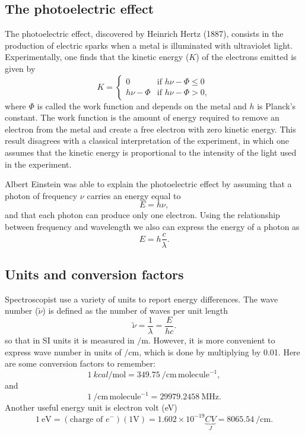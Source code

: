\documentclass[../Main/chem331-notes.tex]{subfiles}
\begin{document}
\subsection{The photoelectric effect}
The photoelectric effect, discovered by Heinrich Hertz (1887), consists in the production of electric sparks when a metal is illuminated with ultraviolet light.
Experimentally, one finds that the kinetic energy ($K$) of the electrons emitted is given by
\begin{equation}
K = \begin{cases}
0 & \text{if } h\nu - \Phi  \leq 0 \\
h\nu - \Phi & \text{if } h\nu - \Phi  > 0,
\end{cases}
\end{equation}
where $\Phi$ is called the work function and depends on the metal and $h$ is Planck's constant.
The work function is the amount of energy required to remove an electron from the metal and create a free electron with zero kinetic energy.
This result disagrees with a classical interpretation of the experiment, in which one assumes that the kinetic energy is proportional to the intensity of the light used in the experiment.

Albert Einstein was able to explain the photoelectric effect by assuming that a photon of frequency $\nu$ carries an energy equal to
\begin{equation}
E = h \nu,
\end{equation}
and that each photon can produce only one electron.
Using the relationship between frequency and wavelength we also can express the energy of a photon as
\begin{equation}
E = h \frac{c}{\lambda}.
\end{equation}

\subsection{Units and conversion factors}
Spectroscopist use a variety of units to report energy differences.
The wave number ($\tilde{\nu}$) is defined as the number of waves per unit length
\begin{equation}
\tilde{\nu} = \frac{1}{\lambda} = \frac{E}{hc}.
\end{equation}
so that in SI units it is measured in $\si{\per\meter}$. However, it is more convenient to express wave number in units of $\si{\per\centi\meter}$, which is done by multiplying by 0.01.
Here are some conversion factors to remember:
\begin{equation}
\SI{1}{kcal\per\mole} = \SI{349.75}{\per\centi\meter}\,\mathrm{molecule}^{-1},
\end{equation}
and 
\begin{equation}
\SI{1}{\per\centi\meter}\,\mathrm{molecule}^{-1} = \SI{29979.2458}{\mega\hertz}.
\end{equation}
Another useful energy unit is electron volt (eV)
\begin{equation}
\SI{1}{\electronvolt} = (\text{charge of }e^{-})(1\si{\volt})  =  1.602\times10^{-19} \underbrace{C V}_{J} 
=\SI{8065.54}{\per\centi\meter}.
\end{equation}
\end{document}
